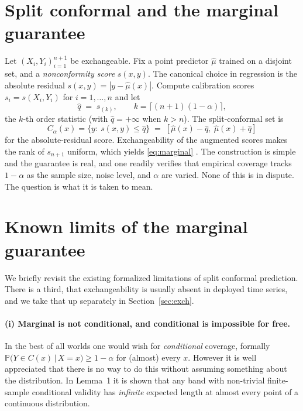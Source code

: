 \documentclass[11pt]{article}
\theoremstyle{definition}
\renewcommand{\Pr}{\mathbb{P}}
\newcommand{\given}{\,\vert\,}
\begin{document}
\section{Split conformal and the marginal guarantee}\label{sec:setup}

Let $(X_i,Y_i)_{i=1}^{n+1}$ be exchangeable. Fix a point predictor $\hat\mu$ trained on
a disjoint set, and a \emph{nonconformity score} $s(x,y)$. The canonical choice in
regression is the absolute residual $s(x,y)=|y-\hat\mu(x)|$. Compute calibration
scores $s_i=s(X_i,Y_i)$ for $i=1,\dots,n$ and let
\begin{equation}\label{eq:q}
  \hat q \;=\; s_{(k)}, \qquad k=\big\lceil (n+1)(1-\alpha)\big\rceil,
\end{equation}
the $k$-th order statistic (with $\hat q=+\infty$ when $k>n$). The split-conformal set is
\begin{equation}\label{eq:set}
  C_\alpha(x)=\{y:\ s(x,y)\le \hat q\}
  \;=\;[\hat\mu(x)-\hat q,\ \hat\mu(x)+\hat q]
\end{equation}
for the absolute-residual score. Exchangeability of the augmented scores makes the rank
of $s_{n+1}$ uniform, which yields \eqref{eq:marginal}
\citep{vovk2005algorithmic,lei2018distribution}. The construction is simple and the
guarantee is real, and one readily verifies that empirical coverage tracks $1-\alpha$ as
the sample size, noise level, and $\alpha$ are varied. None of this is in dispute. The
question is what it is taken to mean.

\section{Known limits of the marginal guarantee}\label{sec:marginal}

We briefly revisit the existing formalized limitations of split conformal prediction. There
is a third, that exchangeability is usually absent in deployed time series, and we take that
up separately in Section~\ref{sec:exch}.

\paragraph{(i) Marginal is not conditional, and conditional is impossible for free.}


In the best of all worlds one would wish for \emph{conditional} coverage, formally
$\Pr\big(Y\in C(x)\given X=x\big)\ge 1-\alpha$ for (almost) every $x$. However it is well appreciated
that there is no way to do this without assuming something about the distribution. In \citet{lei2014distribution} Lemma~1 it is shown
that any band
with non-trivial finite-sample conditional validity has \emph{infinite} expected length
at almost every point of a continuous distribution.
\end{document}
